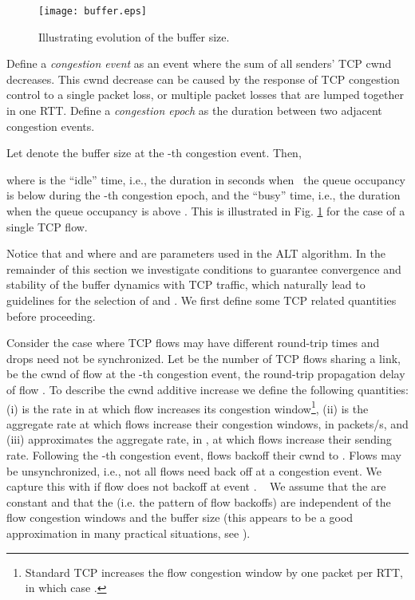 \documentclass[10pt,twocolumn, journal]{IEEEtran}
\def\DLaddition#1{\noindent\ {\color{black} #1}}
\begin{document}
\begin{figure}[tb]
   \centering
   \texttt{[image: buffer.eps]}
   \caption{Illustrating evolution of the buffer size.}
   \label{fig_buffer}
\end{figure}

Define a \emph{congestion event} as an event where the sum of all senders' TCP cwnd decreases. This cwnd decrease can be caused by the response of TCP congestion control to a single packet loss, or multiple packet losses that are lumped together in one RTT. Define a \emph{congestion epoch} as the duration between two adjacent congestion events.

Let  denote the buffer size at the -th congestion event. Then,

where  is the ``idle'' time, i.e., the duration in seconds when\DLaddition{the queue occupancy is below  
during the -th congestion epoch, and  the ``busy'' time, i.e., the duration when
the queue occupancy is above .} This is illustrated in Fig. \ref{fig_buffer} for the case of a
single TCP flow.

Notice that  and  where  and  are parameters used in the ALT
algorithm. In the remainder of this section we
investigate conditions to guarantee convergence and stability of the buffer dynamics with
TCP traffic, which naturally lead to guidelines for the selection of  and . We
first define some TCP related quantities before proceeding.

Consider the case where TCP flows may have different round-trip times and drops need not
be synchronized. Let  be the number of TCP flows sharing a link,  be the cwnd
of flow  at the -th congestion event,  the round-trip propagation delay of
flow . To describe the cwnd additive increase we define the following quantities: (i)
 is the rate in  at which flow  increases its congestion
window\footnote{Standard TCP increases the flow congestion window by one packet per RTT,
in which case .}, (ii)  is the
aggregate rate at which flows increase their congestion windows, in packets/s, and (iii)
 approximates the aggregate rate, in , at
which flows increase their sending rate.   Following the -th congestion event, flows
backoff their cwnd to . Flows may be unsynchronized, i.e., not all
flows need back off at a congestion event. We capture this with  if flow
 does not backoff at event . \DLaddition{We assume that the  are constant and that the  (i.e. the pattern of flow backoffs) are independent of the flow congestion windows  and the buffer size  (this appears to be a good approximation in many practical situations, see \cite{shorten_ton_2006}).  }
\end{document}
